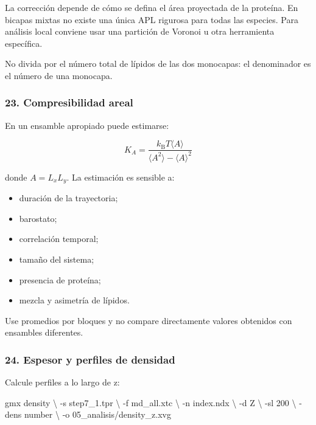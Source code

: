 \documentclass[
  spanish,
  11pt,
  a4paper]{article}
\newenvironment{Shaded}{\begin{snugshade}}{\end{snugshade}}
\newcommand{\AttributeTok}[1]{\textcolor[rgb]{0.13,0.29,0.53}{#1}}
\newcommand{\DataTypeTok}[1]{\textcolor[rgb]{0.13,0.29,0.53}{#1}}
\newcommand{\ExtensionTok}[1]{#1}
\newcommand{\NormalTok}[1]{#1}
\providecommand{\tightlist}{%
  \setlength{\itemsep}{0pt}\setlength{\parskip}{0pt}}
\begin{document}
La corrección depende de cómo se defina el área proyectada de la
proteína. En bicapas mixtas no existe una única APL rigurosa para todas
las especies. Para análisis local conviene usar una partición de Voronoi
u otra herramienta específica.

No divida por el número total de lípidos de las dos monocapas: el
denominador es el número de una monocapa.

\subsubsection{23. Compresibilidad areal}\label{compresibilidad-areal}

En un ensamble apropiado puede estimarse:

\[
K_A=
\frac{k_\mathrm{B}T\langle A\rangle}
     {\langle A^2\rangle-\langle A\rangle^2}
\]

donde \(A=L_xL_y\). La estimación es sensible a:

\begin{itemize}
\tightlist
\item
  duración de la trayectoria;
\item
  barostato;
\item
  correlación temporal;
\item
  tamaño del sistema;
\item
  presencia de proteína;
\item
  mezcla y asimetría de lípidos.
\end{itemize}

Use promedios por bloques y no compare directamente valores obtenidos
con ensambles diferentes.

\subsubsection{24. Espesor y perfiles de
densidad}\label{espesor-y-perfiles-de-densidad}

Calcule perfiles a lo largo de z:

\begin{Shaded}
\begin{Highlighting}[]
\ExtensionTok{gmx}\NormalTok{ density }\DataTypeTok{\textbackslash{}}
    \AttributeTok{{-}s}\NormalTok{ step7\_1.tpr }\DataTypeTok{\textbackslash{}}
    \AttributeTok{{-}f}\NormalTok{ md\_all.xtc }\DataTypeTok{\textbackslash{}}
    \AttributeTok{{-}n}\NormalTok{ index.ndx }\DataTypeTok{\textbackslash{}}
    \AttributeTok{{-}d}\NormalTok{ Z }\DataTypeTok{\textbackslash{}}
    \AttributeTok{{-}sl}\NormalTok{ 200 }\DataTypeTok{\textbackslash{}}
    \AttributeTok{{-}dens}\NormalTok{ number }\DataTypeTok{\textbackslash{}}
    \AttributeTok{{-}o}\NormalTok{ 05\_analisis/density\_z.xvg}
\end{Highlighting}
\end{Shaded}
\end{document}
